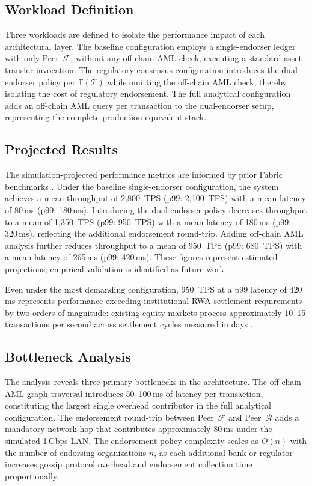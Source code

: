 \documentclass[journal,10pt,twocolumn]{IEEEtran}
\begin{document}
\subsection{Workload Definition}

Three workloads are defined to isolate the performance impact of each architectural layer. The baseline configuration employs a single-endorser ledger with only Peer~$\mathcal{F}$, without any off-chain AML check, executing a standard asset transfer invocation. The regulatory consensus configuration introduces the dual-endorser policy per $\mathbb{E}(\mathcal{T})$ while omitting the off-chain AML check, thereby isolating the cost of regulatory endorsement. The full analytical configuration adds an off-chain AML query per transaction to the dual-endorser setup, representing the complete production-equivalent stack.

\subsection{Projected Results}

The simulation-projected performance metrics are informed by prior Fabric benchmarks \cite{ref:manevich}. Under the baseline single-endorser configuration, the system achieves a mean throughput of 2,800~TPS (p99: 2,100~TPS) with a mean latency of 80\,ms (p99: 180\,ms). Introducing the dual-endorser policy decreases throughput to a mean of 1,350~TPS (p99: 950~TPS) with a mean latency of 180\,ms (p99: 320\,ms), reflecting the additional endorsement round-trip. Adding off-chain AML analysis further reduces throughput to a mean of 950~TPS (p99: 680~TPS) with a mean latency of 265\,ms (p99: 420\,ms). These figures represent estimated projections; empirical validation is identified as future work.

Even under the most demanding configuration, 950~TPS at a p99 latency of 420\,ms represents performance exceeding institutional RWA settlement requirements by two orders of magnitude: existing equity markets process approximately 10--15 transactions per second across settlement cycles measured in days \cite{ref:ecb_dlt}.

\subsection{Bottleneck Analysis}

The analysis reveals three primary bottlenecks in the architecture. The off-chain AML graph traversal introduces 50--100\,ms of latency per transaction, constituting the largest single overhead contributor in the full analytical configuration. The endorsement round-trip between Peer~$\mathcal{F}$ and Peer~$\mathcal{R}$ adds a mandatory network hop that contributes approximately 80\,ms under the simulated 1\,Gbps LAN. The endorsement policy complexity scales as $O(n)$ with the number of endorsing organizations $n$, as each additional bank or regulator increases gossip protocol overhead and endorsement collection time proportionally.
\end{document}
